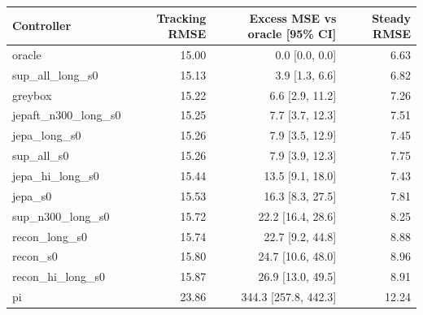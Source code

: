 \begin{tabular}{lrrr}
\toprule
Controller & Tracking RMSE & Excess MSE vs oracle [95\% CI] & Steady RMSE\\
\midrule
oracle & 15.00 & 0.0 [0.0, 0.0] & 6.63\\
sup\_all\_long\_s0 & 15.13 & 3.9 [1.3, 6.6] & 6.82\\
greybox & 15.22 & 6.6 [2.9, 11.2] & 7.26\\
jepaft\_n300\_long\_s0 & 15.25 & 7.7 [3.7, 12.3] & 7.51\\
jepa\_long\_s0 & 15.26 & 7.9 [3.5, 12.9] & 7.45\\
sup\_all\_s0 & 15.26 & 7.9 [3.9, 12.3] & 7.75\\
jepa\_hi\_long\_s0 & 15.44 & 13.5 [9.1, 18.0] & 7.43\\
jepa\_s0 & 15.53 & 16.3 [8.3, 27.5] & 7.81\\
sup\_n300\_long\_s0 & 15.72 & 22.2 [16.4, 28.6] & 8.25\\
recon\_long\_s0 & 15.74 & 22.7 [9.2, 44.8] & 8.88\\
recon\_s0 & 15.80 & 24.7 [10.6, 48.0] & 8.96\\
recon\_hi\_long\_s0 & 15.87 & 26.9 [13.0, 49.5] & 8.91\\
pi & 23.86 & 344.3 [257.8, 442.3] & 12.24\\
\bottomrule
\end{tabular}